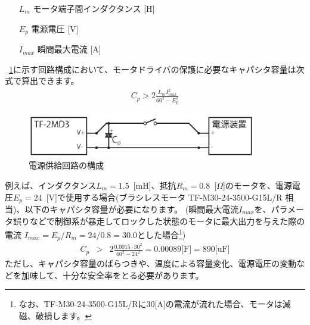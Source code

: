 \documentclass[11pt,a4j,openany,fleqn]{jbook}
\begin{document}
\begin{itemize}
\setlength{\leftskip}{30pt}
\item [$L_{m}$] モータ端子間インダクタンス [H]
\item [$E_{p}$] 電源電圧 [V]
\item [$I_{max}$] 瞬間最大電流 [A]
\end{itemize}

\figurename~\ref{fig:circuit_cap}に示す回路構成において、モータドライバの保護に必要なキャパシタ容量は次式で算出できます。
\begin{eqnarray*}
C_{p} > 2 \frac{L_{m} I_{max}^{2}}{60^2 - E_{p}^{2}}
\end{eqnarray*}

\begin{figure}[H]
\centering\includegraphics[width=100mm]{circuit_cap.eps}
\caption{電源供給回路の構成}
\label{fig:circuit_cap}
\end{figure}

例えば、インダクタンス$L_{m}=1.5$~[mH]、抵抗$R_{m}=0.8$~[$\Omega$]のモータを、電源電圧$E_{p}=24$~[V]で使用する場合(ブラシレスモータ TF-M30-24-3500-G15L/R 相当)、以下のキャパシタ容量が必要になります。
(瞬間最大電流$I_{max}$を、パラメータ誤りなどで制御系が暴走してロックした状態のモータに最大出力を与えた際の電流 $I_{max}=E_{p}/R_{m}=24/0.8=30.0$とした場合\footnote{なお、TF-M30-24-3500-G15L/Rに$30$[A]の電流が流れた場合、モータは減磁、破損します。})
\begin{eqnarray*}
C_{p} &>& 2 \frac{0.0015 \cdot 30^{2}}{60^{2} - 24^{2}} = 0.00089 \text{[F]} = 890 \text{[uF]}
\end{eqnarray*}
ただし、キャパシタ容量のばらつきや、温度による容量変化、電源電圧の変動などを加味して、十分な安全率をとる必要があります。
\end{document}
